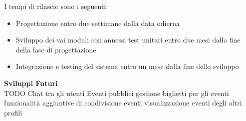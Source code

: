 I tempi di rilascio sono i seguenti:
\begin{itemize}
    \item Progettazione entro due settimane dalla data odierna
    \item Sviluppo dei vai moduli con annessi test unitari entro due mesi dalla fine della fase di progettazione
    \item Integrazione e testing del sistema entro un mese dalla fine dello sviluppo
\end{itemize}
\hfill \break

\textbf{Sviluppi Futuri}
\\

TODO
Chat tra gli utenti
Eventi pubblici
gestione biglietti per gli eventi
funzionalità aggiuntive di condivisione eventi
visualizzazione eventi degli altri profili
